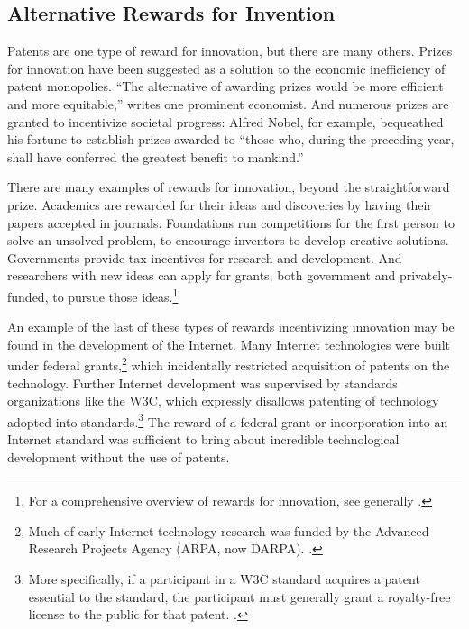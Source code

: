 \documentclass[11pt,twocolumn,titlepage]{article}
\begin{document}
\subsection{Alternative Rewards for Invention}
\SectionNote

Patents are one type of reward for innovation, but there are many others.
Prizes for innovation have been suggested as a solution to the economic
inefficiency of patent monopolies. ``The alternative of awarding prizes would be
more efficient and more equitable,'' writes one prominent
economist. And  numerous prizes are granted to incentivize societal progress:
Alfred Nobel, for example, bequeathed his fortune to establish prizes awarded to
``those who, during the preceding year, shall have conferred the greatest
benefit to mankind.''

There are many examples of rewards for innovation, beyond the straightforward
prize. Academics are rewarded for their ideas and discoveries by having their
papers accepted in journals. Foundations run competitions for the first person
to solve an unsolved problem, to encourage inventors to develop creative
solutions. Governments provide tax incentives for research and development. And
researchers with new ideas can apply for grants, both government and
privately-funded, to pursue those ideas.\footnote{For a comprehensive overview
of rewards for innovation, see generally .}

An example of the last of these types of rewards incentivizing innovation may be
found in the development of the Internet. Many Internet technologies were built
under federal grants,\footnote{Much of early Internet technology research was
funded by the Advanced Research Projects Agency (ARPA, now DARPA). .}
which incidentally restricted acquisition of
patents on the technology.
Further Internet development was supervised
by standards organizations like the W3C, which expressly disallows patenting of
technology adopted into standards.\footnote{More specifically, if a participant
in a W3C standard acquires a patent essential to the standard, the participant
must generally grant a royalty-free license to the public for that patent.
.}
The reward of a federal grant or
incorporation into an Internet standard was sufficient to bring about incredible
technological development without the use of patents.
\end{document}
